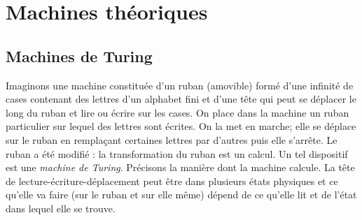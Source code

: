 




\section{Machines théoriques}
\subsection{Machines de Turing}
Imaginons une machine constituée d'un ruban (amovible) formé d'une infinité de cases contenant des lettres d'un alphabet fini et d'une tête qui peut se déplacer le long du ruban et lire ou écrire sur les cases.\newline
On place dans la machine un ruban particulier sur lequel des lettres sont écrites. On la met en marche; elle se déplace sur le ruban en remplaçant certaines lettres par d'autres puis elle s'arrête. Le ruban a été modifié : la transformation du ruban est un \og calcul\fg. \newline
Un tel dispositif est une \emph{machine de Turing}. Précisons la manière dont la machine \og calcule\fg.\newline
La tête de lecture-écriture-déplacement peut être dans plusieurs états physiques et ce qu'elle va faire (sur le ruban et sur elle même) dépend de ce qu'elle lit et de l'état dans lequel elle se trouve. 

